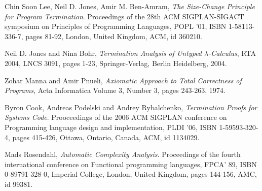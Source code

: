 \begin{thebibliography}{9}


Chin Soon Lee, Neil D. Jones, Amir M. Ben-Amram, \emph{The Size-Change 
Principle for Program Termination}. Proceedings of the 28th ACM SIGPLAN-SIGACT 
symposium on Principles of Programming Languages, POPL '01, ISBN 1-58113-336-7, 
pages 81-92, London, United Kingdom, ACM, id 360210.


Neil D. Jones and Nina Bohr, \emph{Termination Analysis of Untyped 
$\lambda$-Calculus}, RTA 2004, LNCS 3091, pages 1-23, Springer-Verlag, Berlin 
Heidelberg, 2004.


Zohar Manna and Amir Pnueli, \emph{Axiomatic Approach to Total Correctness of 
Programs}, Acta Informatica Volume 3, Number 3, pages 243-263, 1974.


Byron Cook, Andreas Podelski and Andrey Rybalchenko, \emph{Termination Proofs 
for Systems Code}. Prooceedings of the 2006 ACM SIGPLAN conference on 
Programming language design and implementation, PLDI '06, ISBN 1-59593-320-4, 
pages 415-426, Ottawa, Ontario, Canada, ACM, id 1134029.


Mads Rosendahl, \emph{Automatic Complexity Analysis}. Proceedings of the fourth 
international conference on Functional programming languages, FPCA' 89, ISBN 
0-89791-328-0, Imperial College, London, United Kingdom, pages 144-156, AMC, id 
99381.

\end{thebibliography}


